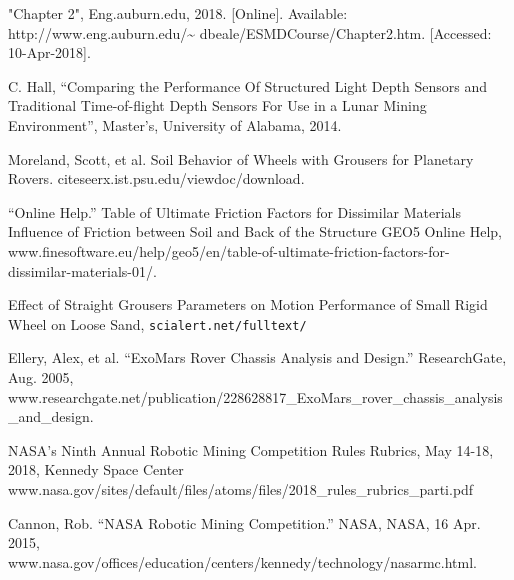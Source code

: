 \documentclass[class=article, crop=false]{standalone}
\begin{document}
\renewcommand\refname{Bibliography}
	\begin{thebibliography}{10}
	 "Chapter 2", Eng.auburn.edu, 2018. [Online]. Available: http://www.eng.auburn.edu/\~{} dbeale/ESMDCourse/Chapter2.htm. [Accessed: 10-Apr-2018].
	 
	 C. Hall, ``Comparing the Performance Of Structured Light Depth Sensors and Traditional Time-of-flight Depth Sensors For Use in a Lunar Mining Environment'', Master's, University of Alabama, 2014.
	 
	 Moreland, Scott, et al. Soil Behavior of Wheels with Grousers for Planetary Rovers. citeseerx.ist.psu.edu/viewdoc/download.
	 
	 ``Online Help.'' Table of Ultimate Friction Factors for Dissimilar Materials Influence of Friction between Soil and Back of the Structure GEO5 Online Help, www.finesoftware.eu/help/geo5/en/table-of-ultimate-friction-factors-for-dissimilar-materials-01/.
	 
	 Effect of Straight Grousers Parameters on Motion Performance of Small Rigid Wheel on Loose Sand, \texttt{scialert.net/fulltext/}
	 
	 Ellery, Alex, et al. ``ExoMars Rover Chassis Analysis and Design.'' ResearchGate, Aug. 2005, www.researchgate.net/publication/228628817\_ExoMars\_rover\_chassis\_analysis\_and\_design.
	 
	 NASA's Ninth Annual Robotic Mining Competition Rules Rubrics, May 14-18, 2018, Kennedy Space Center www.nasa.gov/sites/default/files/atoms/files/2018\_rules\_rubrics\_parti.pdf
	 
	 Cannon, Rob. ``NASA Robotic Mining Competition.'' NASA, NASA, 16 Apr. 2015, www.nasa.gov/offices/education/centers/kennedy/technology/nasarmc.html.
	 
	\end{thebibliography}
\end{document}
